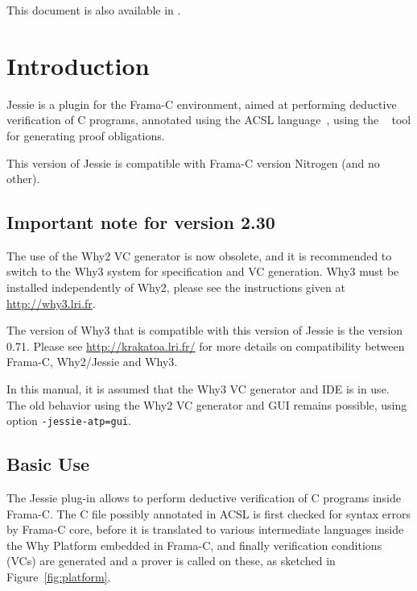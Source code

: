 \documentclass[a4paper,11pt,twoside,openright]{report}
\begin{document}
\ifhevea%
This document is also available in .
\else
\sloppy
{}
\fi


\tableofcontents

\chapter{Introduction}

Jessie is a plugin for the Frama-C environment, aimed at performing
deductive verification of C programs, annotated using the ACSL
language~\cite{baudin09acsl}, using the \Why{}~\cite{why} tool for
generating proof obligations.

This version \whyversion{} of Jessie is compatible with Frama-C version
Nitrogen (and no other).

\section{Important note for version 2.30}

The use of the Why2 VC generator is now obsolete, and it is
recommended to switch to the Why3 system for specification and VC
generation. Why3 must be installed independently of Why2, please see the
instructions given at \url{http://why3.lri.fr}.

The version of Why3 that is compatible with this version \whyversion{} of Jessie
is the version 0.71. Please see \url{http://krakatoa.lri.fr/} for more
details on compatibility between Frama-C, Why2/Jessie and Why3.

In this manual, it is assumed that the Why3 VC generator and IDE is in
use.  The old behavior using the Why2 VC generator and GUI remains
possible, using option \texttt{-jessie-atp=gui}.

\section{Basic Use}

The Jessie plug-in allows to perform deductive verification of C
programs inside Frama-C. The C file possibly annotated in ACSL is
first checked for syntax errors by Frama-C core, before it is
translated to various intermediate languages inside the Why Platform
embedded in Frama-C, and finally verification conditions (VCs) are
generated and a prover is called on these, as sketched in
Figure~\ref{fig:platform}.
\end{document}

